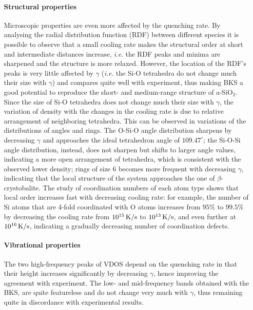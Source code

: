 \paragraph{Structural properties}
Microscopic properties are even more affected by the quenching rate. 
By analysing the radial distribution function (RDF) between different species it is possible to observe that a small cooling rate makes the structural order at short and intermediate distances increase, \emph{i.e.} the RDF peaks and minima are sharpened and the structure is more relaxed. However, the location of the RDF's peaks is very little affected by $\gamma$ (\emph{i.e.} the Si-O tetrahedra do not change much their size with $\gamma$) and compares quite well with experiment, thus making BKS a good potential to reproduce the short- and medium-range structure of a-SiO$_2$. 
Since the size of Si-O tetrahedra does not change much their size with $\gamma$, the variation of density with the changes in the cooling rate is due to relative arrangement of neighboring tetrahedra. 
This can be observed in variations of the distributions of angles and rings. The O-Si-O angle distribution sharpens by decreasing $\gamma$ and approaches the ideal tetrahedron angle of $109.47^\circ$; the Si-O-Si angle distribution, instead, does not sharpen but shifts to larger angle values, indicating a more open arrangement of tetrahedra, which is consistent with the observed lower density; rings of size $6$ becomes more frequent with decreasing $\gamma$, indicating that the local structure of the system approaches the one of $\beta$-crystobalite. 
The study of coordination numbers of each atom type shows that local order increases fast with decreasing cooling rate: for example, the number of Si atoms that are 4-fold coordinated with O atoms increases from $95\%$ to $99.5\%$ by decreasing the cooling rate from $10^{15}\,\mathrm{K/s}$ to $10^{13}\,\mathrm{K/s}$, and even further at $10^{10}\,\mathrm{K/s}$, indicating a gradually decreasing number of coordination defects. 

\paragraph{Vibrational properties}
The two high-frequency peaks of VDOS depend on the quenching rate in that their height increases significantly by decreasing $\gamma$, hence improving the agreement with experiment. 
The low- and mid-frequency bands obtained with the BKS, are quite featureless and do not change very much with $\gamma$, thus remaining quite in discordance with experimental results. 

